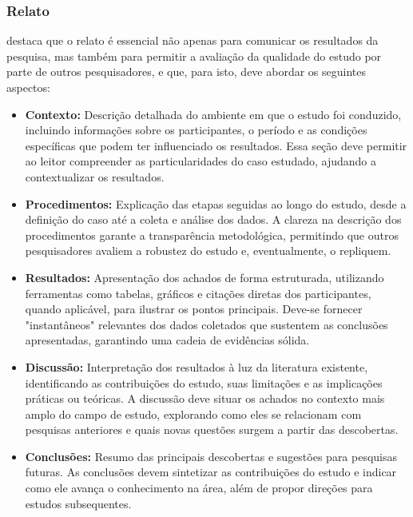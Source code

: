 \subsubsection{Relato}

 destaca que o relato é essencial não apenas para comunicar os resultados da pesquisa, mas também para permitir a avaliação da qualidade do estudo por parte de outros pesquisadores, e que, para isto, deve abordar os seguintes aspectos:

\begin{itemize}
\item \textbf{Contexto:} Descrição detalhada do ambiente em que o estudo foi conduzido, incluindo informações sobre os participantes, o período e as condições específicas que podem ter influenciado os resultados. Essa seção deve permitir ao leitor compreender as particularidades do caso estudado, ajudando a contextualizar os resultados.

\item \textbf{Procedimentos:} Explicação das etapas seguidas ao longo do estudo, desde a definição do caso até a coleta e análise dos dados. A clareza na descrição dos procedimentos garante a transparência metodológica, permitindo que outros pesquisadores avaliem a robustez do estudo e, eventualmente, o repliquem.

\item \textbf{Resultados:} Apresentação dos achados de forma estruturada, utilizando ferramentas como tabelas, gráficos e citações diretas dos participantes, quando aplicável, para ilustrar os pontos principais. Deve-se fornecer "instantâneos" relevantes dos dados coletados que sustentem as conclusões apresentadas, garantindo uma cadeia de evidências sólida.

\item \textbf{Discussão:} Interpretação dos resultados à luz da literatura existente, identificando as contribuições do estudo, suas limitações e as implicações práticas ou teóricas. A discussão deve situar os achados no contexto mais amplo do campo de estudo, explorando como eles se relacionam com pesquisas anteriores e quais novas questões surgem a partir das descobertas.

\item \textbf{Conclusões:} Resumo das principais descobertas e sugestões para pesquisas futuras. As conclusões devem sintetizar as contribuições do estudo e indicar como ele avança o conhecimento na área, além de propor direções para estudos subsequentes.
\end{itemize}

